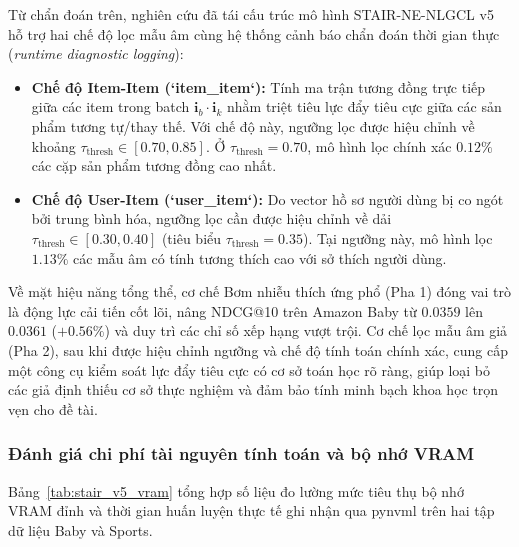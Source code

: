 Từ chẩn đoán trên, nghiên cứu đã tái cấu trúc mô hình STAIR-NE-NLGCL v5 hỗ trợ hai chế độ lọc mẫu âm cùng hệ thống cảnh báo chẩn đoán thời gian thực (\textit{runtime diagnostic logging}):
\begin{itemize}
    \item \textbf{Chế độ Item-Item (`item\_item`):} Tính ma trận tương đồng trực tiếp giữa các item trong batch $\mathbf{i}_b \cdot \mathbf{i}_k$ nhằm triệt tiêu lực đẩy tiêu cực giữa các sản phẩm tương tự/thay thế. Với chế độ này, ngưỡng lọc được hiệu chỉnh về khoảng $\tau_{\text{thresh}} \in [0.70, 0.85]$. Ở $\tau_{\text{thresh}} = 0.70$, mô hình lọc chính xác $0.12\%$ các cặp sản phẩm tương đồng cao nhất.
    \item \textbf{Chế độ User-Item (`user\_item`):} Do vector hồ sơ người dùng bị co ngót bởi trung bình hóa, ngưỡng lọc cần được hiệu chỉnh về dải $\tau_{\text{thresh}} \in [0.30, 0.40]$ (tiêu biểu $\tau_{\text{thresh}} = 0.35$). Tại ngưỡng này, mô hình lọc $1.13\%$ các mẫu âm có tính tương thích cao với sở thích người dùng.
\end{itemize}

Về mặt hiệu năng tổng thể, cơ chế Bơm nhiễu thích ứng phổ (Pha 1) đóng vai trò là động lực cải tiến cốt lõi, nâng NDCG@10 trên Amazon Baby từ $0.0359$ lên $0.0361$ ($+0.56\%$) và duy trì các chỉ số xếp hạng vượt trội. Cơ chế lọc mẫu âm giả (Pha 2), sau khi được hiệu chỉnh ngưỡng và chế độ tính toán chính xác, cung cấp một công cụ kiểm soát lực đẩy tiêu cực có cơ sở toán học rõ ràng, giúp loại bỏ các giả định thiếu cơ sở thực nghiệm và đảm bảo tính minh bạch khoa học trọn vẹn cho đề tài.

\subsubsection{Đánh giá chi phí tài nguyên tính toán và bộ nhớ VRAM}

Bảng~\ref{tab:stair_v5_vram} tổng hợp số liệu đo lường mức tiêu thụ bộ nhớ VRAM đỉnh và thời gian huấn luyện thực tế ghi nhận qua pynvml trên hai tập dữ liệu Baby và Sports.

